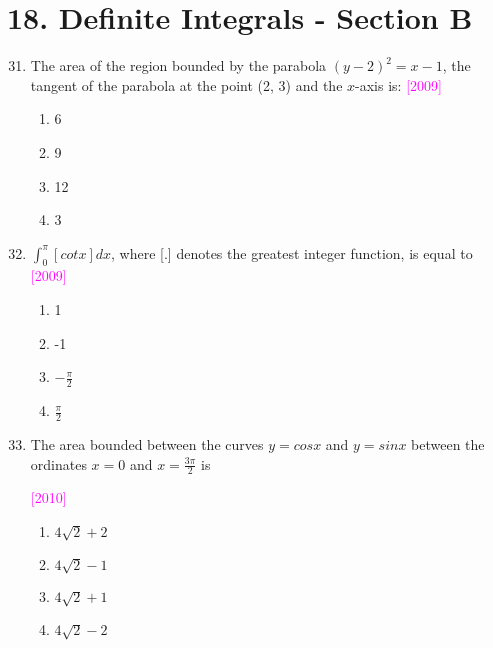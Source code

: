 \documentclass[journal,12pt,twocolumn]{IEEEtran}
\theoremstyle{remark}
\begin{document}
\large\section{\textbf{18. Definite Integrals - Section B}}\small
\begin{enumerate}[label=\textcolor{magenta}{\arabic*.}]
		\setcounter{enumi}{30}


	\item The area of the region bounded by the parabola $(y-2)^2=x-1$, the tangent of the parabola at the point (2, 3) and the $x$-axis is:
		\hfill{\textcolor{magenta}{[2009]}}

		\begin{multicols}{4}
			\begin{enumerate}[label=(\alph*)]
				\item 6
				\item 9
				\item 12
				\item 3
			\end{enumerate}
		\end{multicols}
			
		
	\item $\int_0^\pi[cotx]dx$, where [.] denotes the greatest integer function, is equal to
		\hfill{\textcolor{magenta}{[2009]}}

		\begin{multicols}{4}
			\begin{enumerate}[label=(\alph*)]
				\item 1
				\item -1
				\item $-\frac{\pi}{2}$
				\item $\frac{\pi}{2}$
			\end{enumerate}
		\end{multicols}


	\item The area bounded between the curves $y=cosx$ and $y=sinx$ between the ordinates $x=0$ and $x=\frac{3\pi}{2}$ is

		\hfill{\textcolor{magenta}{[2010]}}

		\begin{multicols}{2}
			\begin{enumerate}[label=(\alph*)]
				\item $4\sqrt{2}+2$
				\item $4\sqrt{2}-1$
				\item $4\sqrt{2}+1$
				\item $4\sqrt{2}-2$
			\end{enumerate}
		\end{multicols}


\end{enumerate}
\end{document}
